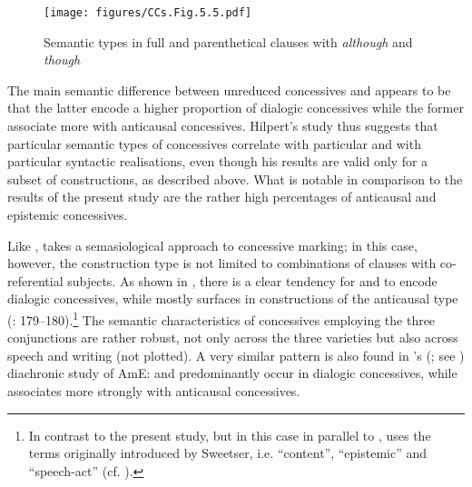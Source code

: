 \begin{figure}
\texttt{[image: figures/CCs.Fig.5.5.pdf]}
\caption{\label{bkm:Ref474698939}\label{fig:5.5}Semantic types in full and parenthetical clauses with \textit{although} and \textit{though} \citep[189]{Hilpert2013a} }
 \end{figure}

The main semantic difference between unreduced concessives and  appears to be that the latter encode a higher proportion of dialogic concessives while the former associate more with anticausal concessives. Hilpert’s study thus suggests that particular semantic types of concessives correlate with particular  and with particular syntactic realisations, even though his results are valid only for a subset of constructions, as described above. What is notable in comparison to the results of the present study are the rather high percentages of anticausal and epistemic concessives.

  Like \citet{Hilpert2013a}, \citet{Schützler2017} takes a semasiological approach to concessive marking; in this case, however, the construction type is not limited to combinations of clauses with co-referential subjects. As shown in , there is a clear tendency for  and  to encode dialogic concessives, while  mostly surfaces in constructions of the anticausal type (\citealt{Schützler2017}: 179–180).\footnote{In contrast to the present study, but in this case in parallel to \citet{Hilpert2013a}, \citet{Schützler2017} uses the terms originally introduced by Sweetser, i.e. “content”, “epistemic” and “speech-act” (cf. ).} The semantic characteristics of concessives employing the three conjunctions are rather robust, not only across the three varieties but also across speech and writing (not plotted). A very similar pattern is also found in \citeauthor{Schützler2018b}’s (\citeyear{Schützler2018b}; see ) diachronic study of AmE:   and  predominantly occur in dialogic concessives, while  associates more strongly with anticausal concessives.

